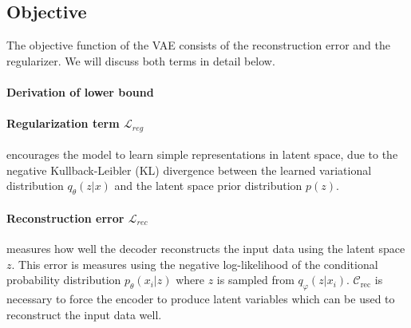 \subsection{Objective}
The objective function of the VAE consists of the reconstruction error and the regularizer.
We will discuss both terms in detail below.

\paragraph{Derivation of lower bound}


\paragraph{Regularization term $\mathcal{L}_{reg}$} encourages the model to learn simple representations in latent space, due to the negative Kullback-Leibler (KL) divergence between the learned variational distribution $q_\theta(z|x)$ and the latent space prior distribution $p(z)$.



\paragraph{Reconstruction error $\mathcal{L}_{rec}$} measures how well the decoder reconstructs the input data using the latent space $z$.
This error is measures using the negative log-likelihood of the conditional probability distribution $p_\theta(x_i|z)$ where $z$ is sampled from $q_\varphi(z | x_i)$.
$\mathcal{C}_{\mathrm{rec}}$ is necessary to force the encoder to produce latent variables which can be used to reconstruct the input data well.








